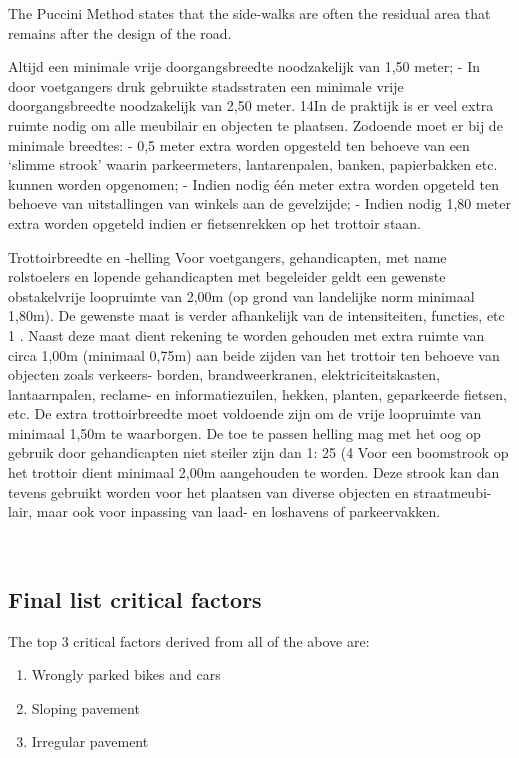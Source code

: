 The Puccini Method states that the side-walks are often the residual area that remains after the design of the road. \cite{puccini2014}

Altijd een minimale vrije doorgangsbreedte noodzakelijk van 1,50 meter;
- In door voetgangers druk gebruikte stadsstraten een minimale vrije doorgangsbreedte
noodzakelijk van 2,50 meter.
14In de praktijk is er veel extra ruimte nodig om alle meubilair en objecten te plaatsen. Zodoende moet
er bij de minimale breedtes:
- 0,5 meter extra worden opgesteld ten behoeve van een ‘slimme strook’ waarin
parkeermeters, lantarenpalen, banken, papierbakken etc. kunnen worden opgenomen;
- Indien nodig één meter extra worden opgeteld ten behoeve van uitstallingen van winkels
aan de gevelzijde;
- Indien nodig 1,80 meter extra worden opgeteld indien er fietsenrekken op het trottoir
staan.



Trottoirbreedte en -helling
Voor voetgangers, gehandicapten, met name rolstoelers en lopende gehandicapten met
begeleider geldt een gewenste obstakelvrije loopruimte van 2,00m (op grond van landelijke
norm minimaal 1,80m).
De gewenste maat is verder afhankelijk van de intensiteiten, functies, etc 1 .
Naast deze maat dient rekening te worden gehouden met extra ruimte van circa 1,00m
(minimaal 0,75m) aan beide zijden van het trottoir ten behoeve van objecten zoals verkeers-
borden, brandweerkranen, elektriciteitskasten, lantaarnpalen, reclame- en informatiezuilen,
hekken, planten, geparkeerde fietsen, etc. De extra trottoirbreedte moet voldoende zijn om de
vrije loopruimte van minimaal 1,50m te waarborgen.
De toe te passen helling mag met het oog op gebruik door gehandicapten niet steiler zijn dan
1: 25 (4%
Voor een boomstrook op het trottoir dient minimaal 2,00m aangehouden te worden. Deze
strook kan dan tevens gebruikt worden voor het plaatsen van diverse objecten en straatmeubi-
lair, maar ook voor inpassing van laad- en loshavens of parkeervakken.

~\cite{leidraad2011}





\subsection{Final list critical factors}

The top 3 critical factors derived from all of the above are: 
\begin{enumerate}
\item Wrongly parked bikes and cars
\item Sloping pavement
\item Irregular pavement
\end{enumerate}

